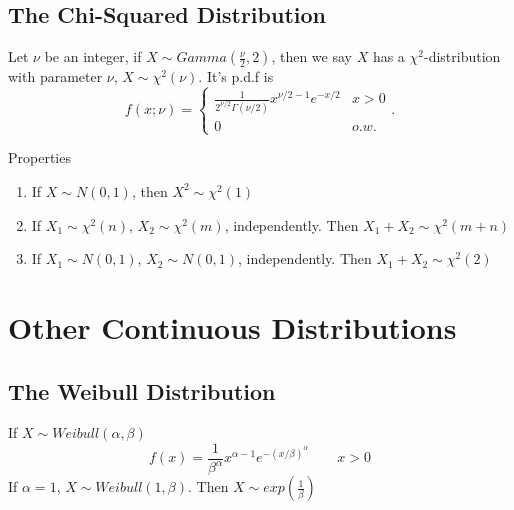 \subsection{The Chi-Squared Distribution}
Let $\nu$ be an integer, if $X \sim Gamma(\frac{\nu}{2},2)$, then we say $X$ has a $\chi^2$-distribution with parameter $\nu$, $X \sim \chi^2 (\nu)$.
It's p.d.f is
\[f(x;\nu)=\begin{cases}
\frac{1}{2^{\nu/2}\Gamma(\nu/2)} x^{\nu/2-1}e^{-x/2} & x>0 \\
0 & o.w.
\end{cases}.\]

\begin{prop}
Properties
\begin{enumerate}
\item If $X \sim N(0,1)$, then $X^2 \sim \chi^2 (1)$
\item If $X_1 \sim \chi^2 (n)$, $X_2 \sim \chi^2 (m)$, independently. Then $X_1+X_2 \sim \chi^2 (m+n)$ 
\item If $X_1 \sim N(0,1)$, $X_2 \sim N(0,1)$, independently. Then $X_1+X_2 \sim \chi^2 (2)$ 
\end{enumerate}
\end{prop}

\section{Other Continuous Distributions}
\subsection{The Weibull Distribution}
If $X \sim Weibull(\alpha,\beta)$
\[f(x)=\frac{1}{\beta^{\alpha}}x^{\alpha-1}e^{-(x/\beta)^{\alpha}} \qquad x >0\]
If $\alpha=1$, $X \sim Weibull(1,\beta)$. Then $X \sim exp(\frac{1}{\beta}) $

